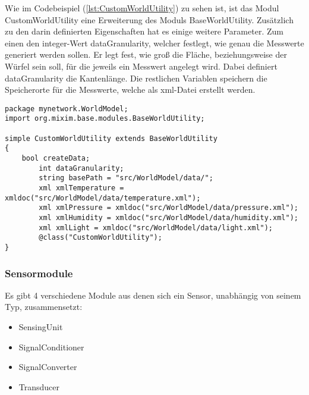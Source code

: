 Wie im Codebeispiel (\ref{lst:CustomWorldUtility}) zu sehen ist, ist das Modul CustomWorldUtility eine Erweiterung des Moduls BaseWorldUtility. Zusätzlich zu den darin definierten Eigenschaften hat es einige weitere Parameter. Zum einen den integer-Wert dataGranularity, welcher festlegt, wie genau die Messwerte generiert werden sollen. Er legt fest, wie groß die Fläche, beziehungsweise der Würfel sein soll, für die jeweils ein Messwert angelegt wird. Dabei definiert dataGranularity die Kantenlänge. Die restlichen Variablen speichern die Speicherorte für die Messwerte, welche als xml-Datei erstellt werden.

\begin{minipage}{\textwidth}
\begin{lstlisting}[language=ned,caption={CustomWorldUtility},label=lst:CustomWorldUtility]
package mynetwork.WorldModel;
import org.mixim.base.modules.BaseWorldUtility;

simple CustomWorldUtility extends BaseWorldUtility
{
    bool createData;
        int dataGranularity;
        string basePath = "src/WorldModel/data/";
        xml xmlTemperature = xmldoc("src/WorldModel/data/temperature.xml");
        xml xmlPressure = xmldoc("src/WorldModel/data/pressure.xml");
        xml xmlHumidity = xmldoc("src/WorldModel/data/humidity.xml");
        xml xmlLight = xmldoc("src/WorldModel/data/light.xml");
        @class("CustomWorldUtility");
}
\end{lstlisting}
\end{minipage}

\subsubsection{Sensormodule}

Es gibt 4 verschiedene Module aus denen sich ein Sensor, unabhängig von seinem Typ, zusammensetzt:

\begin{itemize}
\item SensingUnit
\item SignalConditioner
\item SignalConverter
\item Transducer
\end{itemize}

